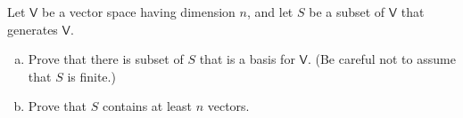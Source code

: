 Let $\mathsf{V}$ be a vector space having dimension $n$, and let $S$
be a subset of $\mathsf{V}$ that generates $\mathsf{V}$.
\begin{enumerate}[(a)]
\item Prove that there is subset of $S$ that is a basis for
  $\mathsf{V}$. (Be careful not to assume that $S$ is finite.)
\item Prove that $S$ contains at least $n$ vectors.
\end{enumerate}
